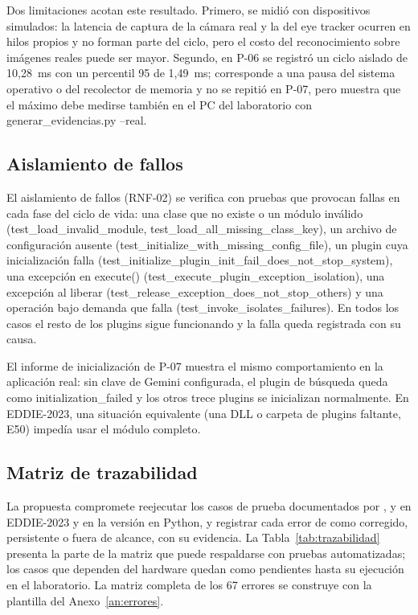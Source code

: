 Dos limitaciones acotan este resultado. Primero, se midió con dispositivos simulados: la latencia de captura de la cámara real y la del eye tracker ocurren en hilos propios y no forman parte del ciclo, pero el costo del reconocimiento sobre imágenes reales puede ser mayor. Segundo, en P-06 se registró un ciclo aislado de 10,28~ms con un percentil 95 de 1,49~ms; corresponde a una pausa del sistema operativo o del recolector de memoria y no se repitió en P-07, pero muestra que el máximo debe medirse también en el PC del laboratorio con generar\_evidencias.py --real.

\subsection{Aislamiento de fallos}

El aislamiento de fallos (RNF-02) se verifica con pruebas que provocan fallas en cada fase del ciclo de vida: una clase que no existe o un módulo inválido (test\_load\_invalid\_module, test\_load\_all\_missing\_class\_key), un archivo de configuración ausente (test\_initialize\_with\_missing\_config\_file), un plugin cuya inicialización falla (test\_initialize\_plugin\_init\_fail\_does\_not\_stop\_system), una excepción en execute() (test\_execute\_plugin\_exception\_isolation), una excepción al liberar (test\_release\_exception\_does\_not\_stop\_others) y una operación bajo demanda que falla (test\_invoke\_isolates\_failures). En todos los casos el resto de los plugins sigue funcionando y la falla queda registrada con su causa.

El informe de inicialización de P-07 muestra el mismo comportamiento en la aplicación real: sin clave de Gemini configurada, el plugin de búsqueda queda como initialization\_failed y los otros trece plugins se inicializan normalmente. En EDDIE-2023, una situación equivalente (una DLL o carpeta de plugins faltante, E50) impedía usar el módulo completo.

\subsection{Matriz de trazabilidad}
\label{sec:trazabilidad}

La propuesta compromete reejecutar los casos de prueba documentados por \citet{pezoa2020implementacion}, \citet{contreras2019desarrollo} y \citet{estay2020modulo} en EDDIE-2023 y en la versión en Python, y registrar cada error de \citet{ibaceta2023evaluacion} como corregido, persistente o fuera de alcance, con su evidencia. La Tabla~\ref{tab:trazabilidad} presenta la parte de la matriz que puede respaldarse con pruebas automatizadas; los casos que dependen del hardware quedan como pendientes hasta su ejecución en el laboratorio. La matriz completa de los 67 errores se construye con la plantilla del Anexo~\ref{an:errores}.

